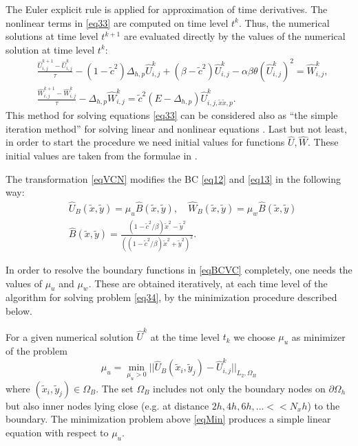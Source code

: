 \documentclass[12pt]{article}
\newcommand{\dO}{\partial\Omega_{h}}
\theoremstyle{theorem}
\theoremstyle{defi}
\begin{document}
The Euler explicit rule is applied for approximation of  time derivatives. The nonlinear terms in \eqref{eq33} are computed on time level $t^k$. Thus, the numerical solutions at time level $t^{k+1}$ are evaluated directly by the values of the numerical solution at time level $t^k$:
 \begin{equation}\label{eq34}
 \begin{split}
   &\frac {\widehat{U}_{i,j}^{k+1}-\widehat{U}_{i,j}^{k}}{\tau}- (1-\tilde c^2 ) \Delta_{h,p} \widehat{U} _{i,j}^{k}+  (\beta-\tilde c^2 ) \widehat{U}_{i,j}^{k} - \alpha \beta \theta (\widehat{U}_{i,j}^{k})^2 = \widehat{W}_{i,j}^{k}, \\
  &\frac  {\widehat{W}_{i,j}^{k+1} -\widehat{W}_{i,j}^{k}} {\tau} - \Delta_{h,p} \widehat{W}_{i,j}^{k} =  \tilde c^2 (E- \Delta_{h,p})
    \widehat{U}_{i,j,{\tilde x \tilde x,p}}^{k}.
\end{split}
\end{equation}
This method for solving equations
\eqref{eq33} can be considered also as ``the simple iteration method'' for solving linear and nonlinear equations \cite{ref16}.
Last but not least, in order to start the procedure we need initial values for functions $\widehat{U},\widehat{W}$. These initial values are taken from the formulae in \cite{ref10}.

The transformation \eqref{eqVCN} modifies the BC \eqref{eq12} and \eqref{eq13} in the following way:
\begin{equation}\label{eqBCVC}
\begin{split}
&\widehat U_B(\tilde{x} , \tilde y) = \mu_u \widehat B( \tilde x, \tilde y) , \quad
\widehat W_B(\tilde{x} , \tilde y) = \mu_w \widehat B( \tilde x, \tilde y) \\
&\widehat B(\tilde{x} , \tilde y) = \frac{ (1 - \tilde c^2/ \beta) \tilde x^2 - \tilde y^2}{( (1 - \tilde c^2/ \beta) \tilde x^2 + \tilde y^2)^2}.
\end{split}
\end{equation}

In order to resolve the boundary functions in \eqref{eqBCVC} completely, one needs the values of $\mu_u$  and $\mu_w$. These are obtained iteratively, at each time level of the algorithm for solving problem \eqref{eq34}, by the minimization procedure described below.

For a given numerical solution $\widehat U ^k$  at the time level  $t_k$ we choose $\mu_u$  as minimizer of the problem
\begin{equation}\label{eqMin}
\mu_u = \min_{ \mu_u > 0 } || \widehat U_B( \tilde x_i, \tilde y_j) - \widehat U ^k_{i,j} ||_{L_2,\Omega_B}
\end{equation}
where  $( \tilde x_i, \tilde y_j) \in \Omega_B$. The set $\Omega_B$ includes not only the boundary nodes on $\dO$ but also inner nodes lying close (e.g. at distance $2h, 4h, 6h, ... << N_x h $) to the boundary. The minimization problem above \eqref{eqMin} produces a simple linear equation with respect to $\mu_u$.
\end{document}
